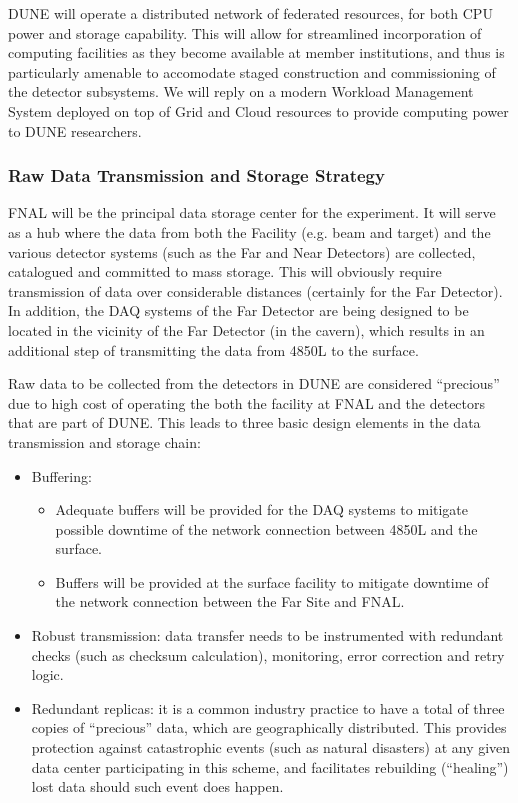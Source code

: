DUNE will operate a  distributed network of federated resources, for both CPU power and storage capability. This will allow for streamlined incorporation
of computing facilities as they become available at member institutions, and thus is particularly amenable to accomodate staged construction and commissioning
of the detector subsystems. We will reply on a modern Workload Management System deployed on top of Grid and Cloud resources to provide computing
power to DUNE researchers.

\subsubsection{Raw Data Transmission and Storage Strategy}
FNAL will be the principal data storage center for the experiment. It will serve as a hub where the data from both the Facility (e.g. beam and target)
and the various detector systems (such as the  Far and Near Detectors)  are collected, catalogued and committed to mass storage. This will obviously require transmission of
data over considerable distances (certainly for the Far Detector). In addition, the DAQ systems of the Far Detector are being designed to be located  in the vicinity of
the Far Detector (in the cavern), which results in an additional step of transmitting the data from 4850L to the surface.

Raw data to be collected from the detectors in DUNE are considered ``precious'' due to high cost of operating the both the facility at FNAL
and the detectors that are part of DUNE. This leads to three basic design elements in the data transmission and storage chain:
\begin{itemize}
\item Buffering:
\begin{itemize}
\item Adequate buffers will be provided for the DAQ systems  to mitigate possible downtime of the network connection between 4850L and the surface.
\item Buffers will be provided at the surface facility to mitigate downtime of the network connection between the Far Site and FNAL.
\end{itemize}
\item Robust transmission: data transfer needs to be instrumented with redundant checks (such as checksum calculation), monitoring, error correction and retry logic.
\item Redundant replicas: it is a common industry practice to have a total of three copies of ``precious'' data, which are geographically distributed. This provides protection against catastrophic events (such as natural disasters) at any given data center participating in this scheme, and facilitates rebuilding (``healing'')  lost data should such event does happen.
\end{itemize}



